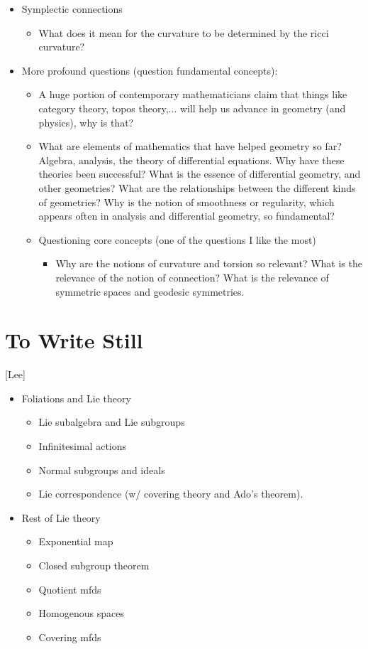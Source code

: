 \documentclass{report}
\theoremstyle{definition}
\begin{document}
\begin{itemize}
    \item Symplectic connections
    \begin{itemize}
        \item What does it mean for the curvature to be determined by the ricci curvature?
    \end{itemize}
    \item More profound questions (question fundamental concepts):
    \begin{itemize}
        \item A huge portion of contemporary mathematicians claim that things like category theory, topos theory,... will help us advance in geometry (and physics), why is that?
        \item What are elements of mathematics that have helped geometry so far? Algebra, analysis, the theory of differential equations. Why have these theories been successful? What is the essence of differential geometry, and other geometries? What are the relationships between the different kinds of geometries? Why is the notion of smoothness or regularity, which appears often in analysis and differential geometry, so fundamental?
        \item Questioning core concepts (one of the questions I like the most)
        \begin{itemize}
            \item Why are the notions of curvature and torsion so relevant? What is the relevance of the notion of connection? What is the relevance of symmetric spaces and geodesic symmetries.
        \end{itemize}
    \end{itemize}
\end{itemize}

\section{To Write Still}

[Lee]

\begin{itemize}
    \item Foliations and Lie theory
    \begin{itemize}
        \item Lie subalgebra and Lie subgroups
        \item Infinitesimal actions
        \item Normal subgroups and ideals
        \item Lie correspondence (w/ covering theory and Ado's theorem).
    \end{itemize}
    \item Rest of Lie theory
    \begin{itemize}
        \item Exponential map
        \item Closed subgroup theorem
        \item Quotient mfds
        \item Homogenous spaces
        \item Covering mfds
    \end{itemize}
\end{itemize}
\end{document}
